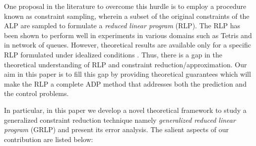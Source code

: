 One proposal in the literature to overcome this hurdle is 
	to employ a procedure known as constraint sampling, 
	wherein a subset of the original constraints of the ALP 
	are sampled to formulate a \emph{reduced linear program} (RLP). 
The RLP has been shown to perform well in experiments \cite{ALP,CS,CST} 
	in various domains such as Tetris and in network of queues. 
However, theoretical results are available only for a specific RLP 
	formulated under idealized conditions \cite{CS}. 
Thus, there is a gap in the theoretical understanding of RLP 
	and constraint reduction/approximation. 
Our aim in this paper is to fill this gap by providing theoretical guarantees 
	which will make the RLP a complete ADP method that addresses 
	both the prediction and the control problems. 

In particular, in this paper we develop a novel theoretical framework 
	to study a generalized constraint reduction technique 
	namely \emph{generalized reduced linear program} (GRLP) and present its error analysis. 
	The salient aspects of our contribution are listed below:
%
